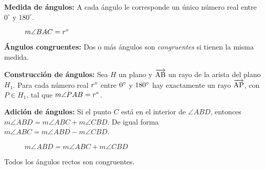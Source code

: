 \begin{postulate}{\textbf{Medida de ángulos:}}
    A cada ángulo le corresponde un único número real entre $0^{\circ}$ y $180^{\circ}$.

\begin{figure}[!h]
    \centering
    
    \label{fig:angle-measure}
    \caption{$m\angle{BAC}=r^{\circ}$}
\end{figure}

\end{postulate}

\begin{definition}{\textbf{Ángulos congruentes:}}
    Dos o más ángulos son \textit{congruentes} si tienen la misma medida.
\end{definition}

\clearpage

\begin{postulate}{\textbf{Construcción de ángulos:}}
    Sea $H$ un plano y $\overrightarrow{\rm AB}$ un rayo de la arista del plano $H_1$. Para cada número real $r^{\circ}$ entre $0^{\circ}$ y $180^{\circ}$ hay exactamente un rayo $\overrightarrow{\rm AP}$, con $P \in H_1$, tal que $m\angle{PAB} = r^{\circ}$.

    \begin{figure}[!h]
        \centering
        
        \label{fig:angle-construction}
    \end{figure}
    
\end{postulate}

\begin{postulate}{\textbf{Adición de ángulos:}}
    Si el punto $C$ está en el interior de $\angle{ABD}$, entonces $m\angle{ABD} = m\angle{ABC} + m\angle{CBD}$. De igual forma $m\angle{ABC} = m\angle{ABD} - m\angle{CBD}$.


    \begin{figure}[!h]
        \centering
        
        \label{fig:angle-addition}
        \caption{$m\angle{ABD} = m\angle{ABC} + m\angle{CBD}$}
    \end{figure}
    
\end{postulate}

\begin{postulate}
    Todos los ángulos rectos son congruentes.
    
    \begin{figure}[!h]
        \centering
        
        \label{fig:postulate14}
    \end{figure}
    
\end{postulate}

